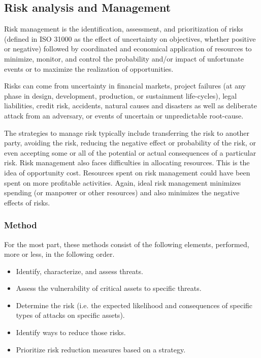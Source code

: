 \documentclass[a4paper,14pt,onecolumn]{article}
\begin{document}
 \subsection{Risk analysis and Management}
\begin{sloppypar}
Risk management is the identification, assessment, and prioritization of risks (defined in ISO 31000 as the effect of uncertainty on objectives, whether positive or negative) followed by coordinated and economical application of resources to minimize, monitor, and control the probability and/or impact of unfortunate events or to maximize the realization of opportunities. \end{sloppypar}
\begin{sloppypar}Risks can come from uncertainty in financial markets, project failures (at any phase in design, development, production, or sustainment life-cycles), legal liabilities, credit risk, accidents, natural causes and disasters as well as deliberate attack from an adversary, or events of uncertain or unpredictable root-cause.
\end{sloppypar}
\begin{sloppypar}
The strategies to manage risk typically include transferring the risk to another party, avoiding the risk, reducing the negative effect or probability of the risk, or even accepting some or all of the potential or actual consequences of a particular risk.
Risk management also faces difficulties in allocating resources. This is the idea of opportunity cost. Resources spent on risk management could have been spent on more profitable activities. Again, ideal risk management minimizes spending (or manpower or other resources) and also minimizes the negative effects of risks.
\end{sloppypar}

\subsubsection{Method}
For the most part, these methods consist of the following elements, performed, more or less, in the following order.
            \begin{itemize}
            \item Identify, characterize, and assess threats.
            \item Assess the vulnerability of critical assets to specific threats.
            \item Determine the risk (i.e. the expected likelihood and consequences of specific types of attacks on specific assets).
            \item Identify ways to reduce those risks.
            \item Prioritize risk reduction measures based on a strategy.
            \end{itemize}
\end{document}

